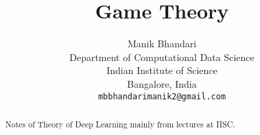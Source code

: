 \documentclass{article}
\title{Game Theory}
\author{
	Manik Bhandari\\
	Department of Computational Data Science\\
	Indian Institute of Science\\
	Bangalore, India \\
	\texttt{mbbhandarimanik2@gmail.com} \\
}
\begin{document}
	
	\maketitle
	
	\begin{abstract}
		Notes of Theory of Deep Learning mainly from lectures at IISC.
	\end{abstract}
	

	
	
\end{document}
